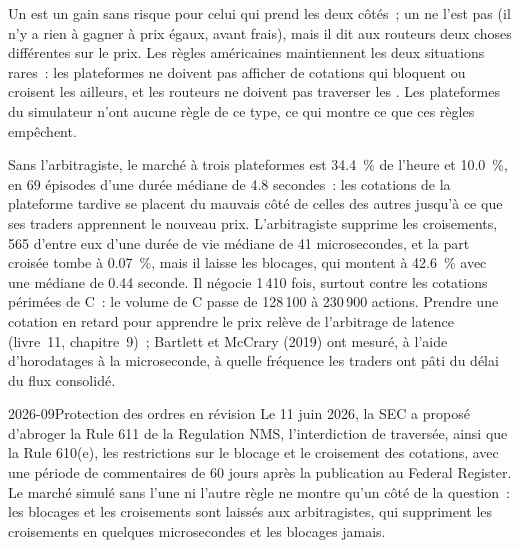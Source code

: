 Un  est un gain sans risque pour celui qui prend les deux côtés~; un  ne l'est pas (il n'y a rien à gagner à prix égaux, avant frais), mais il
dit aux routeurs deux choses différentes sur le prix. Les règles américaines maintiennent les deux situations rares~: les plateformes ne doivent pas afficher de cotations qui bloquent ou croisent les  ailleurs, et
les routeurs ne doivent pas traverser les . Les plateformes du simulateur n'ont aucune règle de ce type, ce qui montre ce que ces règles empêchent.

\label{lst:mx:fragmentation-and-routing:arb}

Sans l'arbitragiste, le marché à trois plateformes
est  34.4~\% de l'heure et  10.0~\%, en 69 épisodes d'une durée médiane de 4.8 secondes~: les cotations de la plateforme tardive se placent du mauvais côté
de celles des autres jusqu'à ce que ses traders apprennent le nouveau prix. L'arbitragiste supprime les croisements, 565 d'entre eux d'une durée de vie médiane de 41 microsecondes, et
la part croisée tombe à 0.07~\%, mais il laisse les blocages, qui montent à 42.6~\% avec une médiane de 0.44 seconde. Il négocie 1\,410 fois, surtout contre les cotations périmées de C~:
le volume de C passe de 128\,100 à 230\,900 actions. Prendre une cotation en retard pour apprendre le prix relève de l'arbitrage de latence (livre~11,
chapitre~9)~; Bartlett et McCrary (2019) ont mesuré, à l'aide d'horodatages à la microseconde, à quelle fréquence les traders ont pâti du délai du flux consolidé.

\begin{dated}{2026-09}{Protection des ordres en révision}\label{dat:mx:fragmentation-and-routing:opr}
Le 11 juin 2026, la SEC a proposé d'abroger la Rule 611 de la Regulation NMS, l'interdiction de traversée, ainsi que la Rule 610(e), les restrictions sur le blocage et
le croisement des cotations, avec une période de commentaires de 60 jours après la publication au Federal Register. Le marché simulé sans l'une ni l'autre règle ne montre qu'un côté
de la question~: les blocages et les croisements sont laissés aux arbitragistes, qui suppriment les croisements en quelques microsecondes et les blocages jamais.
\end{dated}

